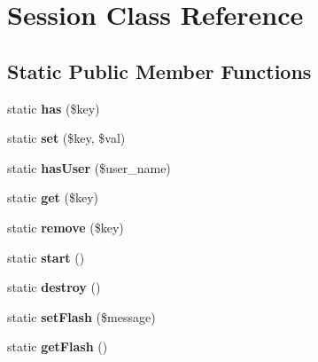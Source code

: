 \hypertarget{class_session}{\section{Session Class Reference}
\label{class_session}
}
\subsection*{Static Public Member Functions}
\begin{DoxyCompactItemize}
\item 
\hypertarget{class_session_a8f660283f72e0f3c5f00b4f98563a79b}{static {\bfseries has} (\$key)}\label{class_session_a8f660283f72e0f3c5f00b4f98563a79b}

\item 
\hypertarget{class_session_a4ecf4c33104949ba1a007a73d71dbb15}{static {\bfseries set} (\$key, \$val)}\label{class_session_a4ecf4c33104949ba1a007a73d71dbb15}

\item 
\hypertarget{class_session_a292b7d28cfcd001085631b11754a3a67}{static {\bfseries has\-User} (\$user\-\_\-name)}\label{class_session_a292b7d28cfcd001085631b11754a3a67}

\item 
\hypertarget{class_session_a15e2679f2a8f6fa4d60757f4d65413ac}{static {\bfseries get} (\$key)}\label{class_session_a15e2679f2a8f6fa4d60757f4d65413ac}

\item 
\hypertarget{class_session_acc60f64095c2df2c0d1e48f9f3ffb9d8}{static {\bfseries remove} (\$key)}\label{class_session_acc60f64095c2df2c0d1e48f9f3ffb9d8}

\item 
\hypertarget{class_session_a146085d0f3a9d17bdcd7f3d4081d8c0d}{static {\bfseries start} ()}\label{class_session_a146085d0f3a9d17bdcd7f3d4081d8c0d}

\item 
\hypertarget{class_session_a93d4348dfe017e3b97a7131f03897121}{static {\bfseries destroy} ()}\label{class_session_a93d4348dfe017e3b97a7131f03897121}

\item 
\hypertarget{class_session_a9814d969d281cbba2b1fe09113735977}{static {\bfseries set\-Flash} (\$message)}\label{class_session_a9814d969d281cbba2b1fe09113735977}

\item 
\hypertarget{class_session_a1d469ccb226888263dbcd44e8a71464c}{static {\bfseries get\-Flash} ()}\label{class_session_a1d469ccb226888263dbcd44e8a71464c}

\end{DoxyCompactItemize}
